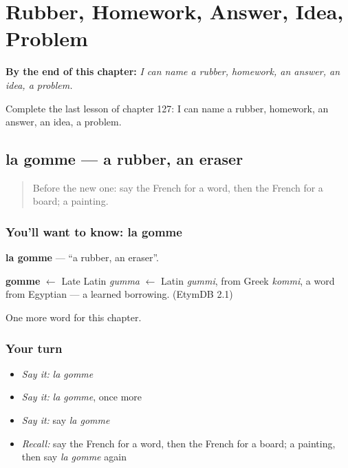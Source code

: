 
\chapter{Rubber, Homework, Answer, Idea, Problem}
\label{ch:fr-rubber-homework-answer-idea-problem}

\begin{chapteropening}
\textbf{By the end of this chapter:} \emph{I can name a rubber, homework, an answer, an idea, a problem.}

Complete the last lesson of chapter 127: I can name a rubber, homework, an answer, an idea, a problem.
\end{chapteropening}

\section[la gomme]{la gomme — a rubber, an eraser}

\label{lesson:FR-C127-gomme}



\begin{quote}
Before the new one: say the French for a word, then the French for a board; a painting.
\end{quote}

\subsection*{You'll want to know: la gomme}
\textbf{la gomme} — \textquotedblleft{}a rubber, an eraser\textquotedblright{}.

\begin{cousinweb}
\textbf{gomme} $\leftarrow$ Late Latin \emph{gumma} $\leftarrow$ Latin \emph{gummi}, from Greek \emph{kommi}, a word from Egyptian — a learned borrowing. (EtymDB 2.1)
\end{cousinweb}

\begin{grammarlens}[title={What you've built}]
One more word for this chapter.
\end{grammarlens}

\subsection*{Your turn}
\begin{itemize}
\raggedright
  \item \emph{Say it:} \emph{la gomme}
  \item \emph{Say it:} \emph{la gomme}, once more
  \item \emph{Say it:} say \emph{la gomme}
  \item \emph{Recall:} say the French for a word, then the French for a board; a painting, then say \emph{la gomme} again
\end{itemize}


